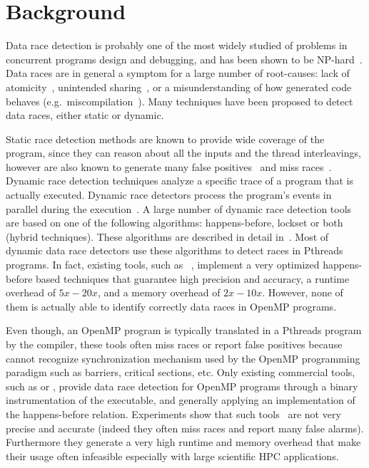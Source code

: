 \section{Background}
\label{sec:background}

Data race detection is probably one of the most widely studied of problems in
concurrent programs design and debugging, and has been shown to be
NP-hard~\cite{netzer-miller}.
%
Data races are in general a symptom for a large number of root-causes: lack
of atomicity~\cite{usenix-race-erickson-et-al}, unintended
sharing~\cite{race-rv-2012-talk}, or a misunderstanding of how generated code
behaves (e.g.\ miscompilation~\cite{Boehm:2011:MPB:2001252.2001255}).
%
Many techniques have been proposed to detect data races, either static or
dynamic.

Static race detection methods are known to provide wide coverage of the
program, since they can reason about all the inputs and the thread
interleavings, however are also known to generate many false
positives~\cite{Pratikakis:2011:LPS:1889997.1890000} and miss
races~\cite{Voung:2007:RSR:1287624.1287654}.
%
Dynamic race detection techniques analyze a specific trace of a program
that is actually executed.
%
Dynamic race detectors process the program’s events in parallel during the
execution~\cite{Lamport:1978:TCO:359545.359563, Savage:1997:EDD:269005.266641,
  Flanagan:2009, tsan}.
%
A large number of dynamic race detection tools are based on one of the
following algorithms: happens-before, lockset or both (hybrid techniques).
%
These algorithms are described in detail
in~\cite{OCallahan:2003:HDD:966049.781528}.
%
Most of dynamic data race detectors use these algorithms to detect races in
Pthreads programs.
%
In fact, existing tools, such as \tsan~\cite{tsan}, implement a very optimized
happens-before based techniques that guarantee high precision and accuracy, a
runtime overhead of $5x-20x$, and a memory overhead of $2x-10x$.
%
However, none of them is actually able to identify correctly data races in OpenMP
programs.

Even though, an OpenMP program is typically translated in a Pthreads program
by the compiler, these tools often miss races or report false positives
because cannot recognize synchronization mechanism used by the OpenMP
programming paradigm such as barriers, critical sections, etc.
%
Only existing commercial tools, such as \insp or \sun, provide data race
detection for OpenMP programs through a binary instrumentation of the
executable, and generally applying an implementation of the happens-before
relation.
%
Experiments show that such tools~\cite{Protze:2014:TPL:2688361.2688369} are
not very precise and accurate (indeed they often miss races and report many
false alarms).
%
Furthermore they generate a very high runtime and memory overhead that make
their usage often infeasible especially with large scientific HPC
applications.

